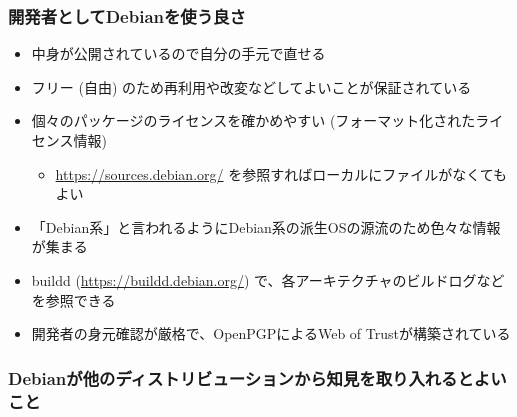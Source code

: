 \documentclass[mingoth,a4paper]{jsarticle}
\begin{document}
\subsubsection{開発者としてDebianを使う良さ}

\begin{itemize}
\item 中身が公開されているので自分の手元で直せる
\item フリー (自由) のため再利用や改変などしてよいことが保証されている
\item 個々のパッケージのライセンスを確かめやすい (フォーマット化されたライセンス情報)
  \begin{itemize}
  \item \url{https://sources.debian.org/} を参照すればローカルにファイルがなくてもよい
  \end{itemize}
\item 「Debian系」と言われるようにDebian系の派生OSの源流のため色々な情報が集まる
\item buildd (\url{https://buildd.debian.org/}) で、各アーキテクチャのビルドログなどを参照できる
\item 開発者の身元確認が厳格で、OpenPGPによるWeb of Trustが構築されている
\end{itemize}

\subsubsection{Debianが他のディストリビューションから知見を取り入れるとよいこと}
\end{document}
